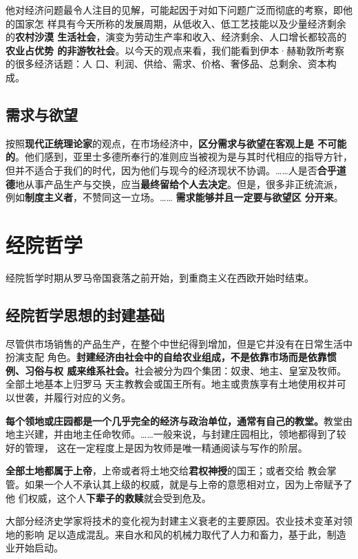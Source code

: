 他对经济问题最令人注目的见解，可能起因于对如下问题广泛而彻底的考察，即他的国家怎
样具有今天所称的发展周期，从低收入、低工艺技能以及少量经济剩余的\textbf{农村沙漠
  生活社会}，演变为劳动生产率和收入、经济剩余、人口增长都较高的\textbf{农业占优势
  的非游牧社会}。以今天的观点来看，我们能看到伊本·赫勒敦所考察的很多经济话题：人
口、利润、供给、需求、价格、奢侈品、总剩余、资本构成。

\subsection{需求与欲望}

按照\textbf{现代正统理论家}的观点，在市场经济中，\textbf{区分需求与欲望在客观上是
  不可能的}。他们感到，亚里士多德所奉行的准则应当被视为是与其时代相应的指导方针，
但并不适合于我们的时代，因为他们与现今的经济现状不协调。……人是否\textbf{合乎道
  德}地从事产品生产与交换，应当\textbf{最终留给个人去决定}。但是，很多非正统流派，
例如\textbf{制度主义者}，不赞同这一立场。…… \textbf{需求能够并且一定要与欲望区
  分开来}。

\section{经院哲学}

经院哲学时期从罗马帝国衰落之前开始，到重商主义在西欧开始时结束。

\subsection{经院哲学思想的封建基础}

尽管供市场销售的产品生产，在整个中世纪得到增加，但是它并没有在日常生活中扮演支配
角色。\textbf{封建经济由社会中的自给农业组成，不是依靠市场而是依靠惯例、习俗与权
  威来维系社会。}社会被分为四个集团：奴隶、地主、皇室及牧师。全部土地基本上归罗马
天主教教会或国王所有。地主或贵族享有土地使用权并可以世袭，并履行对应的义务。

\textbf{每个领地或庄园都是一个几乎完全的经济与政治单位，通常有自己的教堂。}教堂由
地主兴建，并由地主任命牧师。……一般来说，与封建庄园相比，领地都得到了较好的管理，
这在一定程度上是因为牧师是唯一精通阅读与写作的阶层。

\textbf{全部土地都属于上帝}，上帝或者将土地交给\textbf{君权神授}的国王；或者交给
教会掌管。如果一个人不承认其上级的权威，就是与上帝的意愿相对立，因为上帝赋予了他
们权威，这个人\textbf{下辈子的救赎}就会受到危及。

大部分经济史学家将技术的变化视为封建主义衰老的主要原因。农业技术变革对领地的影响
足以造成混乱。来自水和风的机械力取代了人力和畜力，基于此，制造业开始启动。

